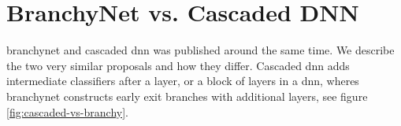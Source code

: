 \section{BranchyNet vs. Cascaded DNN} \label{sec:ee-branchy-vs-cascaded}

\gls{branchynet} \cite{teerapittayanon_branchynet:_2016} and cascaded \gls{dnn} \cite{leroux_resource-constrained_2015} was published around the same time. We describe the two very similar proposals and how they differ.  Cascaded \gls{dnn} adds intermediate classifiers after a layer, or a block of layers in a \gls{dnn}, wheres \gls{branchynet} constructs early exit branches with additional layers, see figure \ref{fig:cascaded-vs-branchy}.

\begin{figure}
	\centering

\end{figure}
